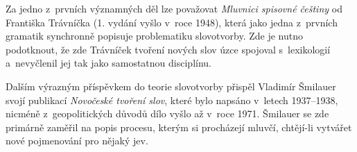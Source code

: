 Za jedno z~prvních významných děl lze považovat \emph{Mluvnici spisovné
češtiny} od Františka Trávníčka (1. vydání vyšlo v~roce 1948), která
jako jedna z~prvních gramatik synchronně popisuje problematiku
slovotvorby. Zde je nutno podotknout, že zde Trávníček tvoření nových
slov úzce spojoval s~lexikologií a~nevyčlenil jej tak jako samostatnou
disciplínu.~\parencite[263]{rousinova}

Dalším výrazným příspěvkem do teorie slovotvorby přispěl Vladimír
Šmilauer svojí publikací \emph{Novočeské tvoření slov}, které bylo
napsáno v~letech 1937--1938, nicméně z~geopolitických důvodů dílo vyšlo
až v~roce 1971. Šmilauer se zde primárně zaměřil na popis procesu,
kterým si procházejí mluvčí, chtějí-li vytvářet nové pojmenování pro
nějaký jev.
